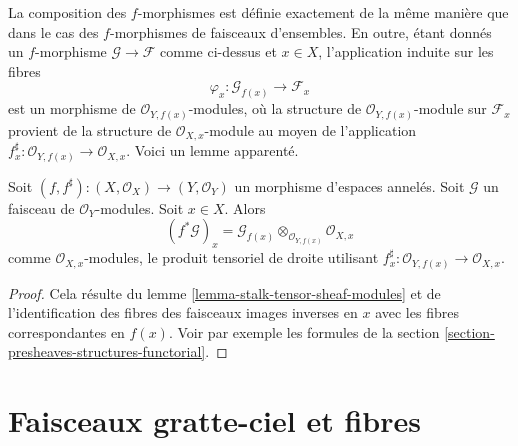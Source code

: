 \medskip\noindent
La composition des $f$-morphismes est définie exactement de la
même manière que dans le cas des $f$-morphismes de faisceaux
d'ensembles. En outre, étant donnés un $f$-morphisme $\mathcal{G} \to \mathcal{F}$
comme ci-dessus et $x \in X$, l'application induite sur les fibres
$$
\varphi_x : \mathcal{G}_{f(x)} \longrightarrow \mathcal{F}_x
$$
est un morphisme de $\mathcal{O}_{Y, f(x)}$-modules, où la
structure de $\mathcal{O}_{Y, f(x)}$-module sur $\mathcal{F}_x$
provient de la structure de $\mathcal{O}_{X, x}$-module au moyen de
l'application $f^\sharp_x : \mathcal{O}_{Y, f(x)} \to \mathcal{O}_{X, x}$.
Voici un lemme apparenté.

\begin{lemma}
\label{lemma-stalk-pullback-modules}
Soit $(f, f^\sharp) : (X, \mathcal{O}_X) \to (Y, \mathcal{O}_Y)$
un morphisme d'espaces annelés.
Soit $\mathcal{G}$ un faisceau de $\mathcal{O}_Y$-modules.
Soit $x \in X$. Alors
$$
(f^*\mathcal{G})_x =
\mathcal{G}_{f(x)}
\otimes_{\mathcal{O}_{Y, f(x)}}
\mathcal{O}_{X, x}
$$
comme $\mathcal{O}_{X, x}$-modules, le produit tensoriel de droite
utilisant $f^\sharp_x : \mathcal{O}_{Y, f(x)} \to \mathcal{O}_{X, x}$.
\end{lemma}

\begin{proof}
Cela résulte du lemme \ref{lemma-stalk-tensor-sheaf-modules}
et de l'identification des fibres des faisceaux images inverses
en $x$ avec les fibres correspondantes en $f(x)$. Voir par
exemple les formules de la section \ref{section-presheaves-structures-functorial}.
\end{proof}



\section{Faisceaux gratte-ciel et fibres}
\label{section-skyscraper-sheaves}

